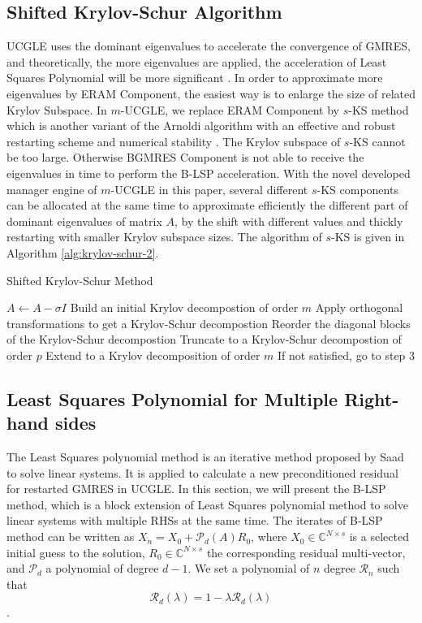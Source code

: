 \subsection{Shifted Krylov-Schur Algorithm}

UCGLE uses the dominant eigenvalues to accelerate the convergence of GMRES, and theoretically, the more eigenvalues are applied, the acceleration of Least Squares Polynomial will be more significant \cite{wu2018distributed}.  In order to approximate more eigenvalues by ERAM Component, the easiest way is to enlarge the size of related Krylov Subspace. In $m$-UCGLE, we replace ERAM Component by $s$-KS method which is another variant of the Arnoldi algorithm with an effective and robust restarting scheme and numerical stability \cite{stewart2002krylov}. The Krylov subspace of  $s$-KS cannot be too large. Otherwise BGMRES Component is not able to receive the eigenvalues in time to perform the B-LSP acceleration. With the novel developed manager engine of $m$-UCGLE in this paper, several different $s$-KS components can be allocated at the same time to approximate efficiently the different part of dominant eigenvalues of matrix $A$, by the shift with different values and thickly restarting with smaller Krylov subspace sizes. The algorithm of $s$-KS is given in Algorithm \ref{alg:krylov-schur-2}.

\begin{algorithm}[htbp]{}
	\caption{Shifted Krylov-Schur Method}   
	\label{alg:krylov-schur-2}   
	\begin{algorithmic}[1]
		\State $A \leftarrow A-\sigma I$ 
		\State Build an initial Krylov decompostion of order $m$
		\State Apply orthogonal transformations to get a Krylov-Schur decompostion
		\State Reorder the diagonal blocks of the Krylov-Schur decompostion
		\State Truncate to a Krylov-Schur decompostion of order $p$
		\State Extend to a Krylov decomposition of order $m$
		\State If not satisfied, go to step 3
		\EndFunction
	\end{algorithmic}  
\end{algorithm}

\subsection{Least Squares Polynomial for Multiple Right-hand sides}

The Least Squares polynomial method is an iterative method proposed by Saad \cite{saad1987least} to solve linear systems. It is applied to calculate a new preconditioned residual for restarted GMRES in UCGLE. In this section, we will present the B-LSP method, which is a block extension of Least Squares polynomial method to solve linear systems with multiple RHSs at the same time. The iterates of B-LSP method can be written as $X_n=X_0+\mathcal{P}_d(A)R_0$, where $X_0 \in \mathbb{C}^{N\times s}$ is a selected initial guess to the solution, $R_0 \in \mathbb{C}^{N\times s}$ the corresponding residual multi-vector, and $\mathcal{P}_d$ a polynomial of degree \(d-1\). We set a polynomial of $n$ degree $\mathcal{R}_n$ such that \[\mathcal{R}_d(\lambda)=1-\lambda \mathcal{R}_d(\lambda)\].

